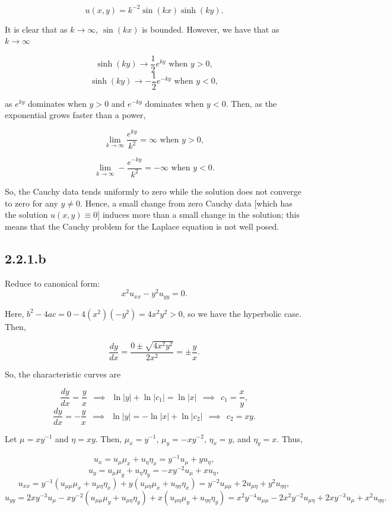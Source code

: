 \documentclass{article}
\begin{document}
\begin{flushleft}
$$u(x,y)=k^{-2}\sin(kx)\sinh(ky).$$

It is clear that as $k\to\infty$, $\sin{(k x)}$ is bounded. However, we have that as $k\to\infty$

$$\sinh(ky) \to \frac{1}{2}e^{ky} \text{  when $y>0$}, $$
$$\sinh(ky) \to -\frac{1}{2}e^{-ky} \text{  when $y<0$}, $$

as $e^{ky}$ dominates when $y>0$ and $e^{-ky}$ dominates when $y<0$. Then, as the exponential grows faster than a power,

$$\lim_{k\to\infty}\frac{e^{ky}}{k^2}=\infty \text{  when $y>0$},$$

$$\lim_{k\to\infty}-\frac{e^{-ky}}{k^2}=-\infty \text{  when $y<0$}.$$

So, the Cauchy data tends uniformly to zero while the solution does not converge to zero for any $y\neq 0$. Hence, a small change from zero Cauchy data [which has the solution $u(x,y)\equiv 0$] induces more than a small change in the solution; this means that the Cauchy problem for the Laplace equation is not well posed.

\subsection{\textbf{2.2.1.b}} Reduce to canonical form: $$x^2u_{xx}-y^2u_{yy}=0.$$

Here, $b^2-4ac = 0-4(x^2)(-y^2)=4x^2y^2 > 0$, so we have the hyperbolic case. Then,

$$\frac{dy}{dx}=\frac{0 \pm \sqrt{4x^2y^2}}{2x^2}=\pm \frac{y}{x}.$$

So, the characteristic curves are

$$\frac{dy}{dx} = \frac{y}{x} ~~\implies~~ \ln|y| + \ln|c_1| = \ln|x| ~~\implies~~ c_1 = \frac{x}{y},$$
$$\frac{dy}{dx} = -\frac{y}{x} ~~\implies~~ \ln|y| = -\ln|x| + \ln|c_2| ~~\implies~~ c_2 = xy.$$

Let $\mu=xy^{-1}$ and $\eta=xy$. Then, $\mu_x = y^{-1}$, $\mu_y=-xy^{-2}$, $\eta_x = y$, and $\eta_y = x$. Thus,

$$u_x = u_\mu \mu_x + u_\eta \eta_x= y^{-1}u_\mu + y u_\eta,$$
$$u_y = u_\mu \mu_y + u_\eta \eta_y= -xy^{-2}u_\mu + x u_\eta,$$
$$u_{xx} = y^{-1}(u_{\mu\mu}\mu_x + u_{\mu\eta}\eta_x) + y(u_{\mu\eta}\mu_x + u_{\eta\eta}\eta_x)=y^{-2}u_{\mu\mu} + 2u_{\mu\eta} + y^2u_{\eta\eta},$$
$$u_{yy} = 2xy^{-3}u_{\mu}-xy^{-2}(u_{\mu\mu}\mu_y + u_{\mu\eta}\eta_y) + x(u_{\mu\eta}\mu_y + u_{\eta\eta}\eta_y)=x^2y^{-4}u_{\mu\mu} - 2x^2y^{-2}u_{\mu\eta} + 2xy^{-3}u_{\mu}+ x^2u_{\eta\eta}.$$


\end{flushleft}
\end{document}

